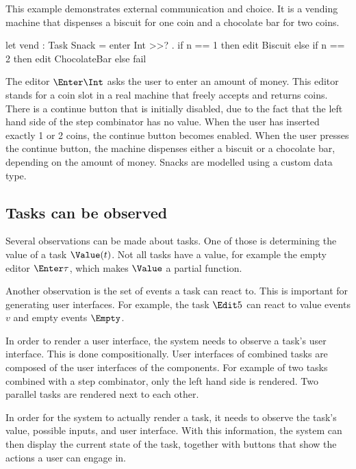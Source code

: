 \begin{example}
\label{Vending machine}

This example demonstrates external communication and choice.
It is a vending machine that dispenses a biscuit for one coin and a chocolate bar for two coins.
\begin{TASK}
  let vend : Task Snack = enter Int >>? \n. if n == 1 then edit Biscuit
    else if n == 2 then edit ChocolateBar
    else fail
\end{TASK}
The editor $\Enter \Int$ asks the user to enter an amount of money.
This editor stands for a coin slot in a real machine that freely accepts and returns coins.
There is a continue button that is initially disabled, due to the fact that the left hand side of the step combinator has no value.
When the user has inserted exactly 1 or 2 coins, the continue button becomes enabled.
When the user presses the continue button, the machine dispenses either a biscuit or a chocolate bar, depending on the amount of money.
Snacks are modelled using a custom data type.

\end{example}



\subsection{Tasks can be observed}

Several observations can be made about tasks.
One of those is determining the value of a task $\Value(t)$.
Not all tasks have a value, for example the empty editor $\Enter \tau$, which makes $\Value$ a partial function.

Another observation is the set of events a task can react to.
This is important for generating user interfaces.
For example, the task $\Edit 5$ can react to value events $v$ and empty events $\Empty$.

In order to render a user interface, the system needs to observe a task's user interface.
This is done compositionally.
User interfaces of combined tasks are composed of the user interfaces of the components.
For example of two tasks combined with a step combinator, only the left hand side is rendered.
Two parallel tasks are rendered next to each other.

In order for the system to actually render a task, it needs to observe the task's value, possible inputs, and user interface.
With this information, the system can then display the current state of the task, together with buttons that show the actions a user can engage in.

